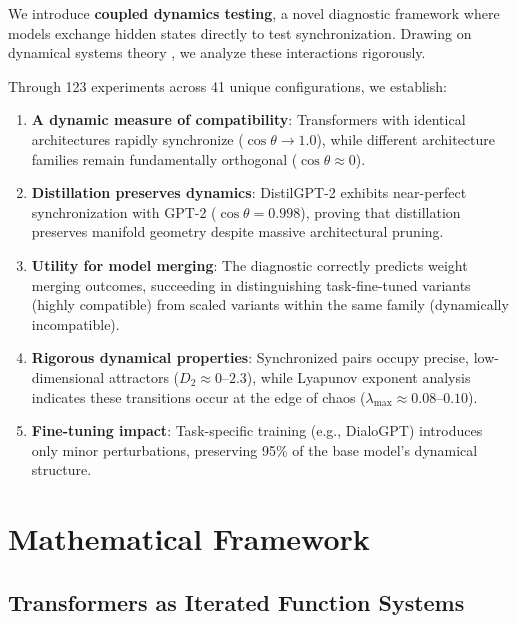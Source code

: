 \documentclass[10pt]{article} %
\theoremstyle{plain}
\theoremstyle{definition}
\theoremstyle{remark}
\begin{document}
We introduce \textbf{coupled dynamics testing}, a novel diagnostic framework where models exchange hidden states directly to test synchronization. Drawing on dynamical systems theory \citep{haber2017stable,chen2018neuralode}, we analyze these interactions rigorously.

Through 123 experiments across 41 unique configurations, we establish:

\begin{enumerate}
    \item \textbf{A dynamic measure of compatibility}: Transformers with identical architectures rapidly synchronize ($\cos \theta \to 1.0$), while different architecture families remain fundamentally orthogonal ($\cos \theta \approx 0$).
    \item \textbf{Distillation preserves dynamics}: DistilGPT-2 exhibits near-perfect synchronization with GPT-2 ($\cos \theta = 0.998$), proving that distillation preserves manifold geometry despite massive architectural pruning.
    \item \textbf{Utility for model merging}: The diagnostic correctly predicts weight merging outcomes, succeeding in distinguishing task-fine-tuned variants (highly compatible) from scaled variants within the same family (dynamically incompatible).
    \item \textbf{Rigorous dynamical properties}: Synchronized pairs occupy precise, low-dimensional attractors ($D_2 \approx 0$--$2.3$), while Lyapunov exponent analysis indicates these transitions occur at the edge of chaos ($\lambda_{\max} \approx 0.08$--$0.10$).
    \item \textbf{Fine-tuning impact}: Task-specific training (e.g., DialoGPT) introduces only minor perturbations, preserving 95\% of the base model's dynamical structure.
\end{enumerate}

\section{Mathematical Framework}

\subsection{Transformers as Iterated Function Systems}
\end{document}

